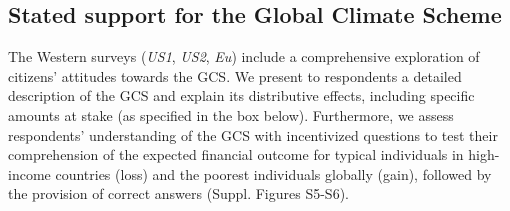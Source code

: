


\subsection{Stated support for the Global Climate Scheme}\label{subsec:gcs_stated_support}

The Western surveys (\textit{US1}, \textit{US2}, \textit{Eu}) include a comprehensive exploration of citizens' attitudes towards the GCS. We present to respondents a detailed description of the GCS and explain its distributive effects, including specific amounts at stake (as specified in the box below). Furthermore, we assess respondents' understanding of the GCS with incentivized questions to test their comprehension of the expected financial outcome for typical individuals in high-income countries (loss) and the poorest individuals globally (gain), followed by the provision of correct answers (Suppl. Figures S5-S6). %

